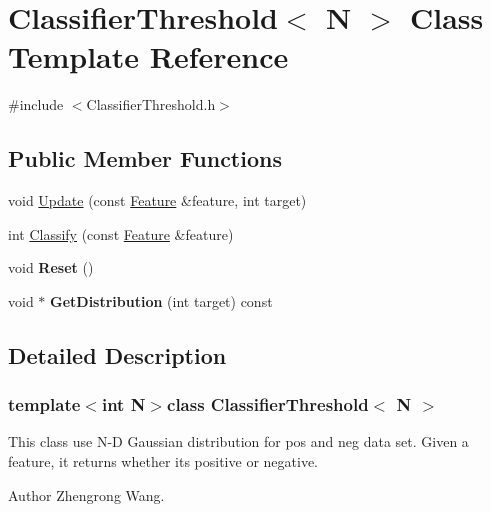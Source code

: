 \hypertarget{classClassifierThreshold}{}\section{Classifier\+Threshold$<$ N $>$ Class Template Reference}
\label{classClassifierThreshold}


{\ttfamily \#include $<$Classifier\+Threshold.\+h$>$}

\subsection*{Public Member Functions}
\begin{DoxyCompactItemize}
\item 
void \hyperlink{classClassifierThreshold_ae9bae753884c08a274b2204af8e97340}{Update} (const \hyperlink{classFeature}{Feature} \&feature, int target)
\item 
int \hyperlink{classClassifierThreshold_a74dff1a82e6d201d6bceedd198e1f105}{Classify} (const \hyperlink{classFeature}{Feature} \&feature)
\item 
\hypertarget{classClassifierThreshold_a1f566cc491d863b15828561cbdfcd7a0}{}void {\bfseries Reset} ()\label{classClassifierThreshold_a1f566cc491d863b15828561cbdfcd7a0}

\item 
\hypertarget{classClassifierThreshold_ac5ea1576c2b8f51dc2643c7f6dbe7724}{}void $\ast$ {\bfseries Get\+Distribution} (int target) const \label{classClassifierThreshold_ac5ea1576c2b8f51dc2643c7f6dbe7724}

\end{DoxyCompactItemize}


\subsection{Detailed Description}
\subsubsection*{template$<$int N$>$class Classifier\+Threshold$<$ N $>$}

This class use N-\/\+D Gaussian distribution for pos and neg data set. Given a feature, it returns whether it\textquotesingle{}s positive or negative. \begin{DoxyAuthor}{Author}
Zhengrong Wang. 
\end{DoxyAuthor}



